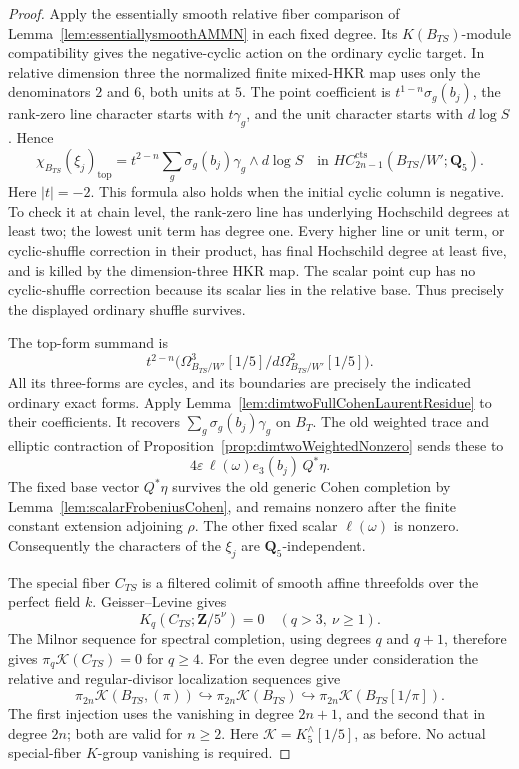 \documentclass[11pt,a4paper]{article}
\theoremstyle{remark}
\begin{document}
\begin{proof}
Apply the essentially smooth relative fiber comparison of
Lemma~\ref{lem:essentiallysmoothAMMN} in each fixed degree.
Its $K(B_{TS})$-module compatibility gives the negative-cyclic
action on the ordinary cyclic target.  In relative dimension
three the normalized finite mixed-HKR map uses only the
denominators $2$ and $6$, both units at $5$.
The point coefficient is $t^{1-n}\sigma_g(b_j)$, the rank-zero
line character starts with $t\gamma_g$, and the unit character
starts with $d\log S$.  Hence
\[
 \chi_{B_{TS}}(\xi_j)_{\mathrm{top}}
    =t^{2-n}\sum_g\sigma_g(b_j)\gamma_g\wedge d\log S
       \quad\text{in }HC^{\mathrm{cts}}_{2n-1}(B_{TS}/W';
                                                    \mathbf Q_5).
\]
Here $|t|=-2$.  This formula also holds when the initial cyclic
column is negative.  To check it at chain level, the rank-zero
line has underlying Hochschild degrees at least two; the
lowest unit term has degree one.  Every higher line or unit
term, or cyclic-shuffle correction in their product, has final
Hochschild degree at least five, and is killed by the
dimension-three HKR map.  The scalar point cup has no
cyclic-shuffle correction because its scalar lies in the
relative base.  Thus precisely the displayed ordinary
shuffle survives.

The top-form summand is
\[
 t^{2-n}\bigl(
 \Omega^3_{B_{TS}/W'}[1/5]/
                  d\Omega^2_{B_{TS}/W'}[1/5]\bigr).
\]
All its three-forms are cycles, and its boundaries are precisely
the indicated ordinary exact forms.  Apply
Lemma~\ref{lem:dimtwoFullCohenLaurentResidue} to their coefficients.
It recovers
$\sum_g\sigma_g(b_j)\gamma_g$ on $B_T$.
The old weighted trace and elliptic contraction of
Proposition~\ref{prop:dimtwoWeightedNonzero} sends these to
\[
 4\varepsilon\,\ell(\omega)e_3(b_j)\,Q^*\eta.
\]
The fixed base vector $Q^*\eta$ survives the old generic Cohen
completion by Lemma~\ref{lem:scalarFrobeniusCohen}, and remains
nonzero after the finite constant extension adjoining $\rho$.
The other fixed scalar $\ell(\omega)$ is nonzero.
Consequently the characters of the $\xi_j$ are
$\mathbf Q_5$-independent.

The special fiber $C_{TS}$ is a filtered colimit of smooth
affine threefolds over the perfect field $k$.  Geisser--Levine
\cite[Theorem~8.4]{GeisserLevineCharP} gives
\[
 K_q(C_{TS};\mathbf Z/5^\nu)=0
      \quad(q>3,\ \nu\geq1).
\]
The Milnor sequence for spectral completion, using degrees
$q$ and $q+1$, therefore gives
$\pi_q\mathcal K(C_{TS})=0$ for $q\geq4$.
For the even degree under consideration the relative and
regular-divisor localization sequences give
\[
 \pi_{2n}\mathcal K(B_{TS},(\pi))
   \hookrightarrow\pi_{2n}\mathcal K(B_{TS})
   \hookrightarrow\pi_{2n}\mathcal K(B_{TS}[1/\pi]).
\]
The first injection uses the vanishing in degree $2n+1$,
and the second that in degree $2n$; both are valid for $n\geq2$.
Here $\mathcal K=K^\wedge_5[1/5]$, as before.  No actual
special-fiber $K$-group vanishing is required.


\end{proof}
\end{document}
